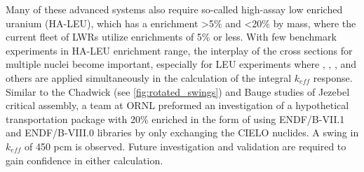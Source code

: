 \documentclass[letterpaper]{ar-1col}
\newcommand{\subfigimg}[4][,]{%
  \setbox1=\hbox{\noindent\texttt{[image: \#3]}}%
  \leavevmode\rlap{\usebox1}%
  \rlap{\hspace*{#4pt}\raisebox{\dimexpr\ht1-2\baselineskip}{#2}}%
  \phantom{\usebox1}%
}
\begin{document}

Many of these advanced systems also require so-called high-assay low enriched uranium (HA-LEU), which has a  enrichment \textgreater5\% and \textless20\% by mass, where the current fleet of LWRs utilize enrichments of 5\% or less.
With few benchmark experiments in HA-LEU enrichment range, the interplay of the cross sections for multiple nuclei become important, especially for LEU experiments where , , ,  and others are applied simultaneously in the calculation of the integral $k_{eff}$ response.
 Similar to the Chadwick \cite{Cha18} (see \autoref{fig:rotated_swings}) and Bauge \cite{Bau12} studies of Jezebel critical assembly, a team at ORNL preformed an investigation of a hypothetical transportation package with 20\% enriched  in the form of  using ENDF/B-VII.1 and ENDF/B-VIII.0 libraries by only exchanging the CIELO nuclides.
A swing in $k_{eff}$ of 450 pcm is observed.
 Future investigation and validation are required to gain confidence in either calculation.
\end{document}
